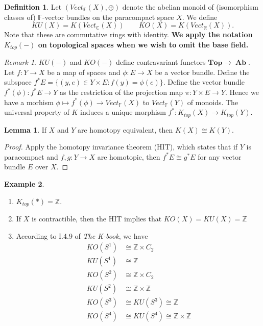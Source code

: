 \documentclass[10pt,letterpaper,cm]{nupset}
\theoremstyle{definition}
\newtheorem{definition}{Definition}
\newtheorem{exmp}[definition]{Example}
\theoremstyle{theorem}
\newtheorem{lemma}[theorem]{Lemma}
\theoremstyle{remark}
\newtheorem{remark}{Remark}
\newcommand{\C}{\mathbb C}
\newcommand{\F}{\mathbb F}
\newcommand{\R}{\mathbb R}
\newcommand{\Z}{\mathbb Z}
\newcommand{\1}{\mathbf{1}}
\newcommand{\0}{\vec 0}
\DeclareMathOperator{\Ab}{\mathbf{Ab}}
\begin{document}
\begin{definition}
Let $(Vect_{\F}(X), \oplus)$ denote the abelian monoid of (isomorphism classes of) $\F$-vector bundles on the paracompact space $X$. We define $$KU(X) = K(Vect_{\C}(X)) \quad \quad KO(X) = K(Vect_{\R}(X)).$$ Note that these are commutative rings with identity. \textbf{We apply the notation $K_{top}(-)$ on topological spaces when we wish to omit the base field.}
\end{definition}

\begin{remark}
$KU(-)$ and $KO(-)$ define contravariant functors $\mathbf{Top} \to \Ab$. Let $f: Y \to X$ be a map of spaces and $\phi : E \to X$ be a vector bundle. Define the subspace $f^{\ast}E = \{(y, e) \in Y \times E : f(y) = \phi(e)\}$.  Define the vector bundle $f^{\ast}(\phi) : f^{\ast}E \to Y$ as the restriction of the projection map $\pi : Y \times E \to Y$. Hence we have a morhism $\phi \mapsto f^{\ast}(\phi) \to Vect_{\F}(X)$ to $Vect_{\F}(Y)$ of monoids. The universal property of $K$ induces a unique morphism $f^{\ast}: K_{top}(X) \to K_{top}(Y)$.
\end{remark}

\begin{lemma}
If $X$ and $Y$ are homotopy equivalent, then $K(X) \cong K(Y)$.
\end{lemma}
\begin{proof}
Apply the homotopy invariance theorem (HIT), which states that if $Y$ is paracompact and $f, g: Y \to X$ are homotopic, then $f^{\ast}E \cong g^{\ast}E$ for any vector bundle $E$ over $X$.
\end{proof}

\begin{exmp} $ $
\begin{enumerate}
\item $K_{top}(\ast) = \Z$.
\item If $X$ is contractible, then the HIT implies that $KO(X) = KU(X) = \Z$
\item According to I.4.9 of \textit{The K-book}, we have
\begin{align*}
KO(S^1) & \cong \Z \times C_2 
\\ KU(S^1) &  \cong \Z \\
KO(S^2) & \cong \Z \times C_2  
\\  KU(S^2) & \cong \Z \times \Z
\\ KO(S^3) & \cong KU(S^3) \cong \Z 
\\ KO(S^4) & \cong KU(S^4) \cong \Z \times \Z
\end{align*}
\end{enumerate}
\end{exmp}
\end{document}
